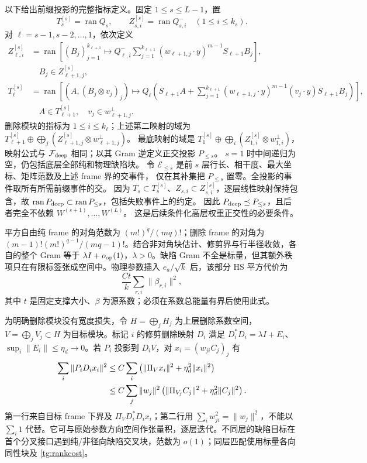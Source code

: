 \documentclass[a4paper]{tufte-handout}
\begin{document}
\begin{fullwidth}
以下给出前缀投影的完整指标定义。固定 $1\le s\le L-1$，置
\[
 T_s^{[s]}=\operatorname{ran}Q_s,\qquad
 Z_{s,i}^{[s]}=\operatorname{ran}Q^-_{s,i}\quad(1\le i\le k_s).
\]
对 $\ell=s-1,s-2,\ldots,1$，依次定义
\begin{align*}
 Z_{\ell,i}^{[s]}&=\operatorname{ran}\left[(B_j)_{j=1}^{k_{\ell+1}}\mapsto
 Q^-_{\ell,i}\sum_{j=1}^{k_{\ell+1}}(w_{\ell+1,j}\cdot y)^{m-1}S_{\ell+1}B_j\right],
 \\[-2pt]&\hspace{1em} B_j\in Z_{\ell+1,j}^{[s]},\\
 T_\ell^{[s]}&=\operatorname{ran}\left[(A,(B_j\otimes v_j)_j)\mapsto Q_\ell
 \left(S_{\ell+1}A+\sum_{j=1}^{k_{\ell+1}}(w_{\ell+1,j}\cdot y)^{m-1}
 (v_j\cdot y)S_{\ell+1}B_j\right)\right],
 \\[-2pt]&\hspace{1em} A\in T_{\ell+1}^{[s]},\quad v_j\in w_{\ell+1,j}^{\perp}.
\end{align*}
删除模块的指标为 $1\le i\le k_\ell$；上述第二映射的域为
$T_{\ell+1}^{[s]}\oplus\bigoplus_j(Z_{\ell+1,j}^{[s]}\otimes w_{\ell+1,j}^{\perp})$。
最底映射的域是 $T_1^{[s]}\oplus\bigoplus_i(Z_{1,i}^{[s]}\otimes w_{1,i}^{\perp})$，
映射公式与 $\mathcal F_{\rm deep}$ 相同；以其 Gram 逆定义正交投影 $P_{\le s}$。
$s=1$ 时中间递归为空，仍包括底层全部纯和物理缺陷块。
令 $\mathcal E_{\le s}$ 是前 $s$ 层行长、相干度、最大坐标、矩阵范数及上述 frame 界的交事件，
仅在其补集把 $P_{\le s}$ 置零。全投影的事件取所有所需前缀事件的交。
因为 $T_s\subset T_s^{[s]}$、$Z_{s,i}\subset Z_{s,i}^{[s]}$，逐层线性映射保持包含，故
$\operatorname{ran}P_{\rm deep}\subset\operatorname{ran}P_{\le s}$，包括失败事件上的约定。
因此 $P_{\rm deep}\preceq P_{\le s}$，且后者完全不依赖 $W^{(s+1)},\ldots,W^{(L)}$。
这是后续条件化高层权重正交性的必要条件。

平方自由纯 frame 的对角范数为 $(m!)^q/(mq)!$；删除 frame 的对角为 $(m-1)!(m!)^{q-1}/(mq-1)!$。结合非对角块估计、修剪界与行半径收敛，各自的整个 Gram 等于 $\lambda I+o_{\rm op}(1)$，$\lambda>0$。缺陷 Gram 不全是标量，但其额外秩项只在有限标签张成空间中。物理参数插入 $e_a/\sqrt{k}$ 后，该部分 HS 平方代价为
\begin{equation}\label{tg:rankcost}
 \frac{Ct}{k}\sum_{r,i}\|\beta_{r,i}\|^2,
\end{equation}
其中 $t$ 是固定支撑大小、$\beta$ 为源系数；必须在系数总能量有界后使用此式。

为明确删除模块没有宽度损失，令 $H=\bigoplus_jH_j$ 为上层删除系数空间，$V=\bigoplus_jV_j\subset H$ 为目标模块。标记 $i$ 的修剪删除映射 $D_i$ 满足
$D_i^*D_i=\lambda I+E_i$、$\sup_i\|E_i\|\le\eta_d\to0$。若 $P_i$ 投影到 $D_iV$，对 $x_i=(w_{ji}C_j)_j$ 有
\begin{align}
 \sum_i\|P_iD_ix_i\|^2
 &\le C\sum_i\left(\|\Pi_Vx_i\|^2+\eta_d^2\|x_i\|^2\right)\notag\\
 &\le C\sum_j\|w_j\|^2\left(\|\Pi_{V_j}C_j\|^2+\eta_d^2\|C_j\|^2\right).\label{tg:delete-transport}
\end{align}
第一行来自目标 frame 下界及 $\Pi_VD_i^*D_ix_i$；第二行用 $\sum_iw_{ji}^2=\|w_j\|^2$，不能以 $\sum_i1$ 代替。它可与原始参数方向空间作张量积，逐层迭代。不同层的缺陷目标在首个分叉接口遇到纯/非径向缺陷交叉块，范数为 $o(1)$；同层匹配使用标量各向同性块及 \eqref{tg:rankcost}。


\end{fullwidth}
\end{document}
